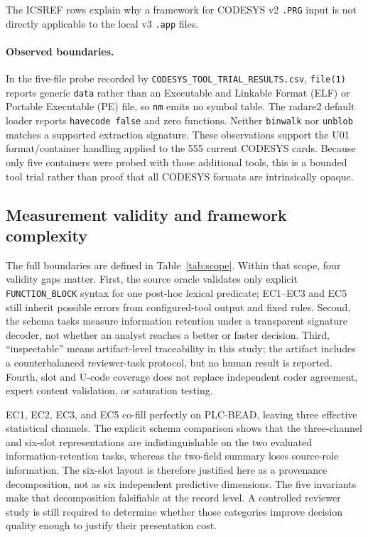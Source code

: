 \documentclass[manuscript,screen,review]{acmart}
\begin{document}
The ICSREF rows explain why a framework for CODESYS v2 \texttt{.PRG} input is not directly applicable to the local v3 \texttt{.app} files.

\paragraph{Observed boundaries.} In the five-file probe recorded by \texttt{CODESYS\_TOOL\_TRIAL\_RESULTS.csv}, \texttt{file(1)} reports generic \texttt{data} rather than an Executable and Linkable Format (ELF) or Portable Executable (PE) file, so \texttt{nm} emits no symbol table. The radare2 default loader reports \texttt{havecode false} and zero functions. Neither \texttt{binwalk} nor \texttt{unblob} matches a supported extraction signature. These observations support the U01 format/container handling applied to the 555 current CODESYS cards. Because only five containers were probed with those additional tools, this is a bounded tool trial rather than proof that all CODESYS formats are intrinsically opaque.

\subsection{Measurement validity and framework complexity}

The full boundaries are defined in Table~\ref{tab:scope}. Within that scope, four validity gaps matter. First, the source oracle validates only explicit \texttt{FUNCTION\_BLOCK} syntax for one post-hoc lexical predicate; EC1--EC3 and EC5 still inherit possible errors from configured-tool output and fixed rules. Second, the schema tasks measure information retention under a transparent signature decoder, not whether an analyst reaches a better or faster decision. Third, ``inspectable'' means artifact-level traceability in this study; the artifact includes a counterbalanced reviewer-task protocol, but no human result is reported. Fourth, slot and U-code coverage does not replace independent coder agreement, expert content validation, or saturation testing.

EC1, EC2, EC3, and EC5 co-fill perfectly on PLC-BEAD, leaving three effective statistical channels. The explicit schema comparison shows that the three-channel and six-slot representations are indistinguishable on the two evaluated information-retention tasks, whereas the two-field summary loses source-role information. The six-slot layout is therefore justified here as a provenance decomposition, not as six independent predictive dimensions. The five invariants make that decomposition falsifiable at the record level. A controlled reviewer study is still required to determine whether those categories improve decision quality enough to justify their presentation cost.
\end{document}
